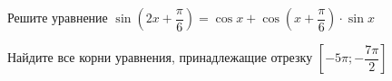 \begin{ex}
	\begin{condition}
		\begin{enumcols}[label=\asbuk*)]
			\item Решите уравнение \( \sin{\left( 2x +  \dfrac{\pi}{6} \right)}= \cos x+ \cos{\left(x + \dfrac{\pi}{6}\right)}\cdot\sin x  \)
			\item Найдите все корни уравнения, принадлежащие отрезку \( \left[-5\pi;-\dfrac{7\pi}{2}\right] \)
		\end{enumcols}
	\end{condition}
\end{ex}
